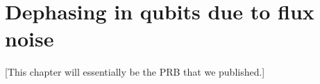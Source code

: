 \chapter{Dephasing in qubits due to flux noise }
\label{chap.dephasing}

[This chapter will essentially be the PRB that we published.]


